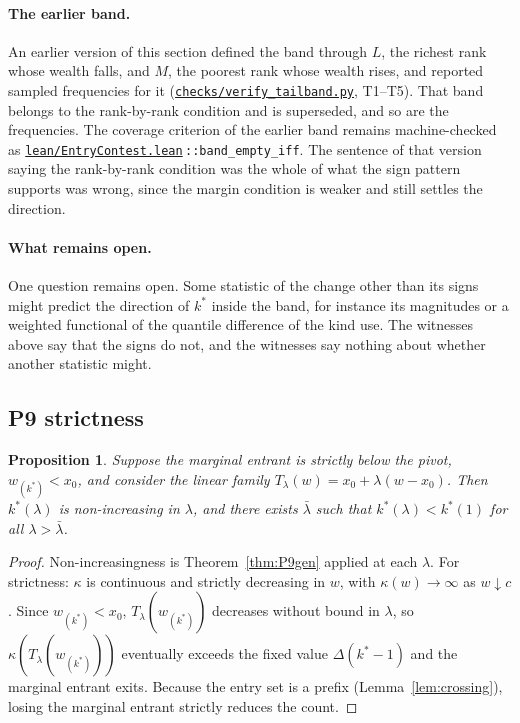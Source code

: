 \documentclass[11pt]{article}
\newtheorem{proposition}{Proposition}
\newcommand{\file}[1]{\href{run:#1}{\texttt{#1}}}
\newcommand{\obj}[2]{\file{#1}\,\texttt{::#2}}
\begin{document}
\begin{sloppypar}
\paragraph{The earlier band.} An earlier version of this section defined the
band through $L$, the richest rank whose wealth falls, and $M$, the poorest rank
whose wealth rises, and reported sampled frequencies for it
(\file{checks/verify\_tailband.py}, T1--T5). That band belongs to the
rank-by-rank condition and is superseded, and so are the frequencies. The
coverage criterion of the earlier band remains machine-checked as
\obj{lean/EntryContest.lean}{band\_empty\_iff}. The sentence of that
version saying the rank-by-rank condition was the whole of what the sign pattern
supports was wrong, since the margin condition is weaker and still settles the
direction.
\end{sloppypar}

\paragraph{What remains open.} One question remains open. Some statistic of
the change other than its signs might predict the direction of $k^*$ inside the
band, for instance its magnitudes or a weighted functional of the quantile
difference of the kind \citet{CostrellLoury2004} use. The witnesses above say
that the signs do not, and the witnesses say nothing about whether another
statistic might.

\subsection{P9 strictness}
\label{prop:P9strict}

\begin{proposition}
\label{prop:strict}
Suppose the marginal entrant is strictly below the pivot,
$w_{(k^*)}<x_0$, and consider the linear family
$T_\lambda(w)=x_0+\lambda(w-x_0)$. Then $k^*(\lambda)$ is non-increasing
in $\lambda$, and there exists $\bar\lambda$ such that
$k^*(\lambda)<k^*(1)$ for all $\lambda>\bar\lambda$.
\end{proposition}
\begin{proof}
Non-increasingness is Theorem~\ref{thm:P9gen} applied at each
$\lambda$. For strictness: $\kappa$ is continuous and strictly
decreasing in $w$, with $\kappa(w)\to\infty$ as $w\downarrow c$. Since
$w_{(k^*)}<x_0$, $T_\lambda(w_{(k^*)})$ decreases without bound in
$\lambda$, so $\kappa(T_\lambda(w_{(k^*)}))$ eventually exceeds the fixed
value $\Delta(k^*-1)$ and the marginal entrant exits. Because the entry
set is a prefix (Lemma~\ref{lem:crossing}), losing the marginal entrant
strictly reduces the count.
\end{proof}
\end{document}
